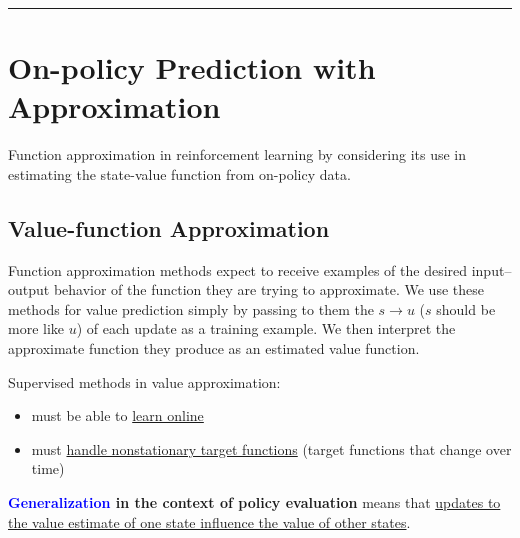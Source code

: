\documentclass[12pt, a4paper]{article}
\let\stdsection\section
\renewcommand\section{\newpage\stdsection} %
\begin{document}
\begin{center}\rule{0.5\linewidth}{0.5pt}\end{center}
\newpage



























\section{On-policy Prediction with Approximation}\label{on-policy-prediction-with-approximation}


Function approximation in reinforcement learning by considering its use in estimating the state-value function from on-policy data.



\subsection{Value-function Approximation}\label{value-function-approximation}


Function approximation methods expect to receive examples of the desired input–output behavior of the function they are trying to approximate. We use these methods for value prediction simply by passing to them the $s \rightarrow u$ ($s$ should be more like $u$) of each update as a training example. We then interpret the approximate function they produce as an estimated value function.


Supervised methods in value approximation:
\begin{itemize}
  \item must be able to \uline{learn online}
  \item must \uline{handle nonstationary target functions} (target functions that change over time)
\end{itemize}



\textbf{\textcolor{blue}{Generalization} in the context of policy evaluation} means that \uline{updates to the value estimate of one state influence the value of other states}.
\end{document}
